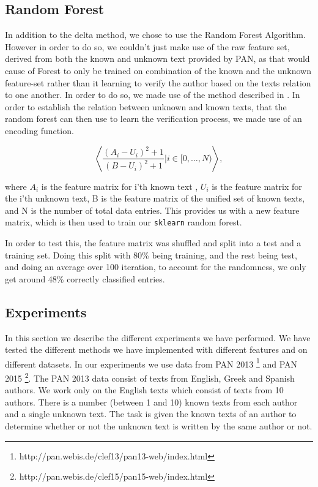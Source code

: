 \subsection{Random Forest}
In addition to the delta method, we chose to use the Random Forest Algorithm.
However in order to do so, we couldn't just make use of the raw feature set,
derived from both the known and unknown text provided by PAN, as that would
cause of Forest to only be trained on combination of the known and the unknown
feature-set rather than it learning to verify the author based on the texts
relation to one another. In order to do so, we made use of the method described
in \cite{pacheco2015}. In order to establish the relation between unknown and
known texts, that the random forest can then use to learn the verification
process, we made use of an encoding function.

\begin{equation}
    \left\langle
        \dfrac{(A_i-U_i)^2+1}{(B-U_i)^2+1}|i \in [0,\dots, N)
    \right\rangle,
\end{equation}

where $A_i$ is the feature matrix for i'th known text , $U_i$ is the feature
matrix for the i'th unknown text, B is the feature matrix of the unified set of
known texts, and N is the number of total data entries. This provides us with
a new feature matrix, which is then used to train our \texttt{sklearn} random
forest.

In order to test this, the feature matrix was shuffled and split into a test and
a training set. Doing this split with 80\% being training, and the rest being
test, and doing an average over 100 iteration, to account for the randomness, we
only get around 48\% correctly classified entries.

\subsection{Experiments}
In this section we describe the different experiments we have performed.
We have tested the different methods we have implemented with different
features and on different datasets. In our experiments we use data from PAN
2013 \footnote{http://pan.webis.de/clef13/pan13-web/index.html} and PAN 2015
\footnote{http://pan.webis.de/clef15/pan15-web/index.html}. The PAN 2013 data
consist of texts from English, Greek and Spanish authors. We work only on the
English texts which consist of texts from 10 authors. There is a number (between
1 and 10) known texts from each author and a single unknown text. The task is
given the known texts of an author to determine whether or not the unknown text
is written by the same author or not.

